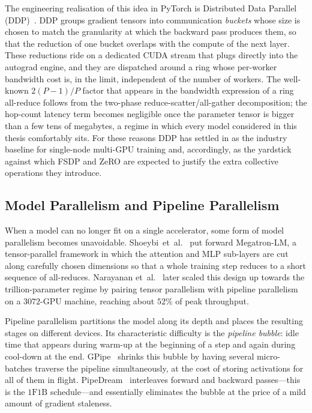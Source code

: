 The engineering realisation of this idea in PyTorch is Distributed
Data Parallel (DDP)~\cite{li2020pytorch}. DDP groups gradient tensors
into communication \emph{buckets} whose size is chosen to match the
granularity at which the backward pass produces them, so that the
reduction of one bucket overlaps with the compute of the next layer.
These reductions ride on a dedicated CUDA stream that plugs directly
into the autograd engine, and they are dispatched around a ring whose
per-worker bandwidth cost is, in the limit, independent of the
number of workers. The well-known $2(P-1)/P$ factor that appears in
the bandwidth expression of a ring all-reduce follows from the
two-phase reduce-scatter/all-gather decomposition; the hop-count
latency term becomes negligible once the parameter tensor is bigger
than a few tens of megabytes, a regime in which every model
considered in this thesis comfortably sits. For these reasons DDP
has settled in as the industry baseline for single-node multi-GPU
training and, accordingly, as the yardstick against which FSDP and
ZeRO are expected to justify the extra collective operations they
introduce.

\subsection{Model Parallelism and Pipeline Parallelism}\label{sec:lit_mp}
When a model can no longer fit on a single accelerator, some form of
model parallelism becomes unavoidable.
Shoeybi~et~al.~\cite{shoeybi2019megatron} put forward Megatron-LM,
a tensor-parallel framework in which the attention and MLP sub-layers
are cut along carefully chosen dimensions so that a whole training
step reduces to a short sequence of all-reduces. Narayanan
et~al.~\cite{narayanan2021efficient} later scaled this design up
towards the trillion-parameter regime by pairing tensor parallelism
with pipeline parallelism on a $3072$-GPU machine, reaching about
$52\%$ of peak throughput.

Pipeline parallelism partitions the model along its depth and places
the resulting stages on different devices. Its characteristic
difficulty is the \emph{pipeline bubble}: idle time that appears
during warm-up at the beginning of a step and again during cool-down
at the end. GPipe~\cite{huang2019gpipe} shrinks this bubble by having
several micro-batches traverse the pipeline simultaneously, at the
cost of storing activations for all of them in flight.
PipeDream~\cite{harlap2018pipedream} interleaves forward and backward
passes---this is the $1\mathrm{F}1\mathrm{B}$ schedule---and
essentially eliminates the bubble at the price of a mild amount of
gradient staleness.

